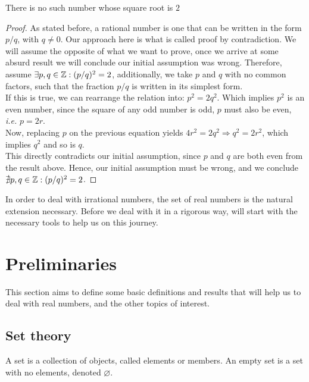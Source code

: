 \begin{theorem}
    There is no such number whose square root is $2$
\end{theorem}

\begin{proof}
    As stated before, a rational number is one that can be written in the form $p/q$, with $q \neq 0$. Our approach here is what is called proof by contradiction. We will assume the opposite of what we want to prove, once we arrive at some absurd result we will conclude our initial assumption was wrong. Therefore, assume $\exists p, q \in \mathbb{Z}: (p/q)^2 = 2$, additionally, we take $p$ and $q$ with no common factors, such that the fraction $p/q$ is written in its simplest form. \\
    If this is true, we can rearrange the relation into: $p^2 = 2 q^2$. Which implies $p^2$ is an even number, since the square of any odd number is odd, $p$ must also be even, \emph{i.e.} $p = 2r$. \\
    Now, replacing $p$ on the previous equation yields $4 r^2 = 2 q^2 \Rightarrow q^2 = 2 r^2$, which implies $q^2$ and so is $q$. \\
    This directly contradicts our initial assumption, since $p$ and $q$ are both even from the result above. Hence, our initial assumption must be wrong, and we conclude $\nexists p,q \in \mathbb{Z}: (p/q)^2=2$.
\end{proof}

In order to deal with irrational numbers, the set of real numbers is the natural extension necessary. Before we deal with it in a rigorous way, will start with the necessary tools to help us on this journey.

\section{Preliminaries}

This section aims to define some basic definitions and results that will help us to deal with real numbers, and the other topics of interest.

\subsection{Set theory}

\begin{definition}[Set]
    A set is a collection of objects, called elements or members. An empty set is a set with no elements, denoted $\varnothing$.
\end{definition}

